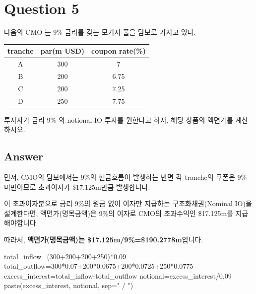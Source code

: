 \documentclass[
  a4paper,
  DIV=11,
  numbers=noendperiod]{scrreprt}
\newenvironment{Shaded}{\begin{snugshade}}{\end{snugshade}}
\newcommand{\AttributeTok}[1]{\textcolor[rgb]{0.40,0.45,0.13}{#1}}
\newcommand{\DecValTok}[1]{\textcolor[rgb]{0.68,0.00,0.00}{#1}}
\newcommand{\FloatTok}[1]{\textcolor[rgb]{0.68,0.00,0.00}{#1}}
\newcommand{\FunctionTok}[1]{\textcolor[rgb]{0.28,0.35,0.67}{#1}}
\newcommand{\NormalTok}[1]{\textcolor[rgb]{0.00,0.23,0.31}{#1}}
\newcommand{\OtherTok}[1]{\textcolor[rgb]{0.00,0.23,0.31}{#1}}
\newcommand{\SpecialCharTok}[1]{\textcolor[rgb]{0.37,0.37,0.37}{#1}}
\newcommand{\StringTok}[1]{\textcolor[rgb]{0.13,0.47,0.30}{#1}}
\begin{document}
\section*{Question 5}\label{question-5}


다음의 CMO 는 9\% 금리를 갖는 모기지 풀을 담보로 가지고 있다.

\begin{longtable}[]{@{}ccc@{}}
\toprule\noalign{}
tranche & par(m USD) & coupon rate(\%) \\
\midrule\noalign{}
\endhead
\bottomrule\noalign{}
\endlastfoot
A & 300 & 7 \\
B & 200 & 6.75 \\
C & 200 & 7.25 \\
D & 250 & 7.75 \\
\end{longtable}

투자자가 금리 9\% 의 notional IO 투자를 원한다고 하자. 해당 상품의
액면가를 계산하시오.

\subsection*{Answer}\label{answer-4}

먼저, CMO의 담보에서는 9\%의 현금흐름이 발생하는 반면 각 tranche의
쿠폰은 9\% 미만이므로 초과이자가 \$17.125m만큼 발생합니다.

이 초과이자분으로 금리 9\%의 원금 없이 이자만 지급하는
구조화채권(Nominal IO)을 설계한다면, 액면가(명목금액)은 9\%의 이자로
CMO의 초과수익인 \$17.125m를 지급해야합니다.

따라서, \textbf{액면가(명목금액)는 \$17.125m/9\%=\$190.2778m}입니다.

\begin{Shaded}
\begin{Highlighting}[]
\NormalTok{total\_inflow}\OtherTok{=}\NormalTok{(}\DecValTok{300}\SpecialCharTok{+}\DecValTok{200}\SpecialCharTok{+}\DecValTok{200}\SpecialCharTok{+}\DecValTok{250}\NormalTok{)}\SpecialCharTok{*}\FloatTok{0.09}
\NormalTok{total\_outflow}\OtherTok{=}\DecValTok{300}\SpecialCharTok{*}\FloatTok{0.07}\SpecialCharTok{+}\DecValTok{200}\SpecialCharTok{*}\FloatTok{0.0675}\SpecialCharTok{+}\DecValTok{200}\SpecialCharTok{*}\FloatTok{0.0725}\SpecialCharTok{+}\DecValTok{250}\SpecialCharTok{*}\FloatTok{0.0775}
\NormalTok{excess\_interest}\OtherTok{=}\NormalTok{total\_inflow}\SpecialCharTok{{-}}\NormalTok{total\_outflow}
\NormalTok{notional}\OtherTok{=}\NormalTok{excess\_interest}\SpecialCharTok{/}\FloatTok{0.09}
\FunctionTok{paste}\NormalTok{(excess\_interest, notional, }\AttributeTok{sep=}\StringTok{" / "}\NormalTok{)}
\end{Highlighting}
\end{Shaded}
\end{document}
